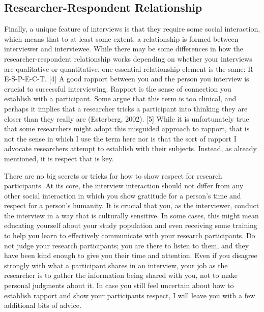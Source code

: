 \subsection{Researcher-Respondent Relationship}

Finally, a unique feature of interviews is that they require some social interaction, which means that to at least some extent, a relationship is formed between interviewer and interviewee. While there may be some differences in how the researcher-respondent relationship works depending on whether your interviews are qualitative or quantitative, one essential relationship element is the same: R-E-S-P-E-C-T. [4] A good rapport between you and the person you interview is crucial to successful interviewing. Rapport is the sense of connection you establish with a participant. Some argue that this term is too clinical, and perhaps it implies that a researcher tricks a participant into thinking they are closer than they really are (Esterberg, 2002). [5] While it is unfortunately true that some researchers might adopt this misguided approach to rapport, that is not the sense in which I use the term here nor is that the sort of rapport I advocate researchers attempt to establish with their subjects. Instead, as already mentioned, it is respect that is key.

There are no big secrets or tricks for how to show respect for research participants. At its core, the interview interaction should not differ from any other social interaction in which you show gratitude for a person’s time and respect for a person’s humanity. It is crucial that you, as the interviewer, conduct the interview in a way that is culturally sensitive. In some cases, this might mean educating yourself about your study population and even receiving some training to help you learn to effectively communicate with your research participants. Do not judge your research participants; you are there to listen to them, and they have been kind enough to give you their time and attention. Even if you disagree strongly with what a participant shares in an interview, your job as the researcher is to gather the information being shared with you, not to make personal judgments about it. In case you still feel uncertain about how to establish rapport and show your participants respect, I will leave you with a few additional bits of advice.

